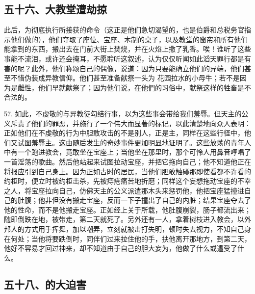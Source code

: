 
\subsection{五十六、大教堂遭劫掠}

此后，为彻底执行所接获的命令（这正是他们急切渴望的，也是伯爵和总税务官指示他们做的），他们夺取了座位、宝座、木制的桌子，以及教堂的窗帘和所有他们能拿到的东西，搬出去在门前大街上焚烧，并在火焰上撒了乳香。唉！谁听了这些事能不流泪，或许还会掩耳，不愿聆听这叙述，认为仅仅听闻如此滔天罪行都是有害的呢？此外，他们称颂自己的偶像，说道：因为只要能确立他们的异端，他们甚至不惜伪装成异教信仰。他们甚至准备献祭一头为  花园拉水的小母牛；若不是因为是雌性，他们早就献祭了；因为他们说，在他們的习俗中，献祭这样的牲畜是不合法的。\par

57. 如此，不虔敬的与异教徒勾结行事，以为这些事会带给我们羞辱。但天主的公义斥责了他们的罪恶，并施行了一个伟大而显著的标记，以此清楚地向众人表明：正如他们在不虔敬的行为中胆敢攻击的不是别人，正是主，同样在这些行径中，他们又试图羞辱主。这由随后发生的奇妙事件更加明显地证明了。这些放荡的青年人中有一个跑进教会，竟敢坐在宝座上；当他坐在那里时，那个可怜人用鼻音哼唱了一首淫荡的歌曲。然后他站起来试图拉动宝座，并把它拖向自己；他不知道他正在将报应引到自己身上。因为正如古时的居民，当他们胆敢触碰那即使看都不许看的约柜时，便立时被约柜击杀，先被痔疮痛苦地折磨；同样这个妄想拖动宝座的不幸之人，将宝座拉向自己，仿佛天主的公义派遣那木头来惩罚他，他把宝座猛撞进自己的肚腹；他非但没有搬走宝座，反而一下子撞出了自己的内脏；结果宝座夺去了他的性命，而不是他搬走宝座。正如经上关于所载，他肚腹崩裂，肠子都流出来；随即倒跌在地，被带走，第二天就死了。另外还有一人，拿着树枝进入教会，以外邦人的方式用手挥舞，加以嘲弄，立刻就被击打失明，顿时失去视力，不知自己身在何处；当他将要跌倒时，同伴们过来拉住他的手，扶他离开那地方，到第二天，他好不容易才回过神来，却不知道由于自己的胆大妄为，他做了什么或遭受了什么。\par


\subsection{五十八、的大迫害}

